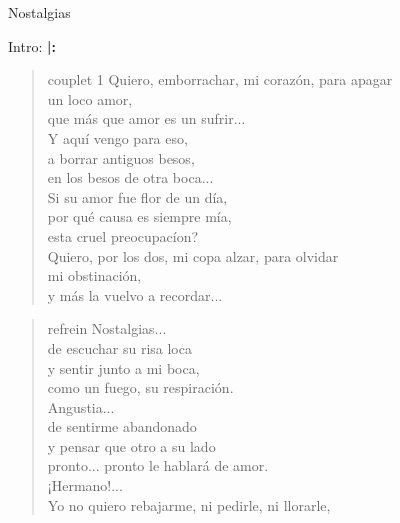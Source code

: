 \begin{song}{Nostalgias}
\begin{instrumental}{Intro:}
	\textbf{|:}
\end{instrumental}

\begin{verse}{couplet 1}
Quiero, emborrachar, mi corazón, para apagar\\
un loco amor,\\
que más que amor es un sufrir...\\
Y aquí vengo para eso,\\
a borrar antiguos besos,\\
en los besos de otra boca...\\ 
Si su amor fue flor de un día,\\
\textquestiondown por qué causa es siempre mía,\\
esta cruel preocupacíon? \hspace{2em} \\
Quiero, por los dos, mi copa alzar, para olvidar\\
mi obstinación,\\
y más la vuelvo a recordar...
\end{verse}
\begin{verse}{refrein}
Nostalgias...\\
de escuchar su risa loca\\
y sentir junto a mi boca,\\
como un fuego, su respiración.\\
Angustia...\\
\chord{---}de sentirme abandonado\\
y pensar que otro a su lado\\
pronto... pronto le hablará de amor.\\
¡Hermano!...   \chord{---}\\
Yo no quiero rebajarme, ni pedirle, ni llorarle,\\

\end{verse}
\end{song}

